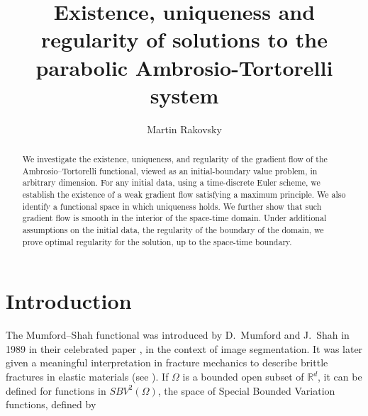 \documentclass[reqno,12pt,twoside]{amsart}
\author[M. Rakovsky]{ Martin Rakovsky}
\title[]{Existence, uniqueness and regularity of solutions to the parabolic Ambrosio-Tortorelli system}
\numberwithin{equation}{section} \numberwithin{theorem}{section}
\numberwithin{proposition}{section} \numberwithin{lemma}{section}
\numberwithin{corollary}{section}
\numberwithin{definition}{section} \numberwithin{remark}{section}
\begin{document}
\begin{abstract}
We investigate the existence, uniqueness, and regularity of the gradient flow of the Ambrosio–Tortorelli functional, viewed as an initial-boundary value problem, in arbitrary dimension.
For any initial data, using a time-discrete Euler scheme, we establish the existence of a weak gradient flow satisfying a maximum principle. We also identify a functional space in which uniqueness holds. We further show that such gradient flow is smooth in the interior of the space-time domain. Under additional assumptions on the initial data, the regularity of the boundary of the domain, we prove optimal regularity for the solution, up to the space-time boundary.
\end{abstract}

\maketitle


\section{Introduction}

The Mumford--Shah functional was introduced by D.~Mumford and J.~Shah in 1989 in their celebrated paper \cite{MS89}, in the context of image segmentation. It was later given a meaningful interpretation in fracture mechanics to describe brittle fractures in elastic materials (see \cite{FM98}). If $\Omega$ is a bounded open subset of $\mathbb{R}^d$, it can be defined for functions in $SBV^2(\Omega)$, the space of Special Bounded Variation functions, defined by 
\end{document}
